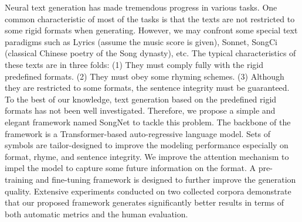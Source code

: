 Neural text generation has made tremendous progress in various tasks. One common characteristic of most of the tasks is that the texts are not restricted to some rigid formats when generating. However, we may confront some special text paradigms such as Lyrics (assume the music score is given), Sonnet, SongCi (classical Chinese poetry of the Song dynasty), etc. The typical characteristics of these texts are in three folds: (1) They must comply fully with the rigid predefined formats. (2) They must obey some rhyming schemes. (3) Although they are restricted to some formats, the sentence integrity must be guaranteed. To the best of our knowledge, text generation based on the predefined rigid formats has not been well investigated. Therefore, we propose a simple and elegant framework named SongNet to tackle this problem. The backbone of the framework is a Transformer-based auto-regressive language model. Sets of symbols are tailor-designed to improve the modeling performance especially on format, rhyme, and sentence integrity. We improve the attention mechanism to impel the model to capture some future information on the format. A pre-training and fine-tuning framework is designed to further improve the generation quality. Extensive experiments conducted on two collected corpora demonstrate that our proposed framework generates significantly better results in terms of both automatic metrics and the human evaluation.
